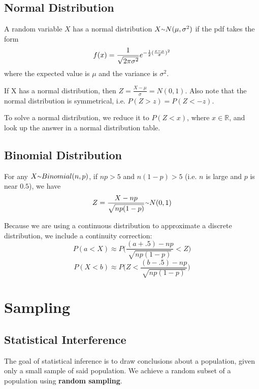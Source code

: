 \documentclass[12pt]{article}
\begin{document}
\subsection*{Normal Distribution}
A random variable $X$ has a normal distribution $X \ttilde N(\mu, \sigma^2)$ if the pdf takes the form \[ f(x) = \frac{1}{\sqrt{2\pi\sigma^2}}e^{-\frac{1}{2} (\frac{x-\mu}{\sigma})^2} \] where the expected value is $\mu$ and the variance is $\sigma^2$.

If X has a normal distribution, then $Z = \frac{X - \mu}{\sigma} = N(0,1)$. Also note that the normal distribution is symmetrical, i.e. $P(Z > z) = P(Z < -z)$.

To solve a normal distribution, we reduce it to $P(Z < x)$, where $x \in \mathbb{R}$, and look up the answer in a normal distribution table.

\subsection*{Binomial Distribution}
For any $X \ttilde Binomial(n,p)$, if $np > 5$ and $n(1-p) > 5$ (i.e. $n$ is large and $p$ is near $0.5$), we have \[ Z = \frac{X - np}{\sqrt{np(1-p)}} \ttilde N(0,1) \]

Because we are using a continuous distribution to approximate a discrete distribution, we include a continuity correction: \[ P(a < X) \approx P\bigg(\frac{(a + .5) - np}{\sqrt{np(1-p)}} < Z\bigg) \] \[ P(X < b) \approx P\bigg(Z < \frac{(b - .5) - np}{\sqrt{np(1-p)}}\bigg) \]

\section*{Sampling}
\subsection*{Statistical Interference}
The goal of statistical inference is to draw conclusions about a population, given only a small sample of said population. We achieve a random subset of a population using {\bf random sampling}.
\end{document}
